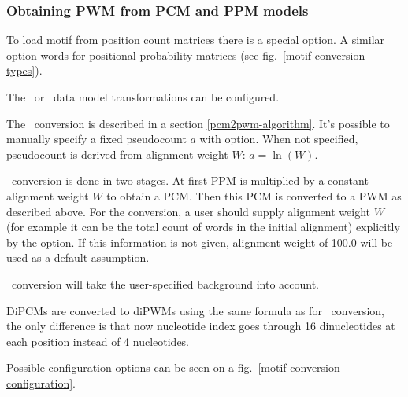 \subsubsection{Obtaining PWM from PCM and PPM models}
To load motif from position count matrices there is a special  option.
A similar option  words for positional probability matrices (see fig.~\ref{motif-conversion-types}).

The \PcmToPwm\ or \PpmToPwm\ data model transformations can be configured.

The \PcmToPwm\ conversion is described in a section \ref{pcm2pwm-algorithm}. It's possible to manually specify a fixed pseudocount $a$ with  option. When not specified, pseudocount is derived from alignment weight $W$: $a =\ln(W)$.

\PpmToPwm\ conversion is done in two stages. At first PPM is multiplied by a constant alignment weight $W$ to obtain a PCM. Then this PCM is converted to a PWM as described above.
For the \PpmToPwm conversion, a user should supply alignment weight $W$ (for example it can be the total count of words in the initial alignment) explicitly by the  option. If this information is not given, alignment weight of 100.0 will be used as a default assumption.

\PcmToPwm\ conversion will take the user-specified background into account.

DiPCMs are converted to diPWMs using the same formula as for \PcmToPwm\ conversion, the only difference is that now nucleotide index goes through 16 dinucleotides at each position instead of 4 nucleotides.

Possible configuration options can be seen on a fig.~\ref{motif-conversion-configuration}.
